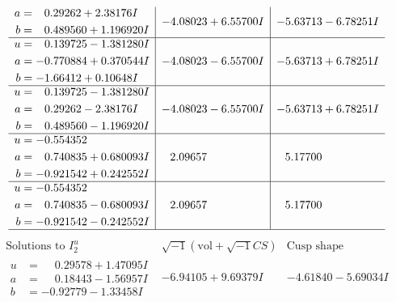 \documentclass[1p]{elsarticle_modified}
\theoremstyle{definition}
\newcommand{\I}{\sqrt{-1}}
\begin{document}
$$\begin{array}{c|c|c}
\begin{aligned}
a &= \phantom{-}0.29262 + 2.38176 I \\
b &= \phantom{-}0.489560 + 1.196920 I\end{aligned}
 & -4.08023 + 6.55700 I & -5.63713 - 6.78251 I \\ \hline\begin{aligned}
u &= \phantom{-}0.139725 - 1.381280 I \\
a &= -0.770884 + 0.370544 I \\
b &= -1.66412 + 0.10648 I\end{aligned}
 & -4.08023 - 6.55700 I & -5.63713 + 6.78251 I \\ \hline\begin{aligned}
u &= \phantom{-}0.139725 - 1.381280 I \\
a &= \phantom{-}0.29262 - 2.38176 I \\
b &= \phantom{-}0.489560 - 1.196920 I\end{aligned}
 & -4.08023 - 6.55700 I & -5.63713 + 6.78251 I \\ \hline\begin{aligned}
u &= -0.554352\phantom{ +0.000000I} \\
a &= \phantom{-}0.740835 + 0.680093 I \\
b &= -0.921542 + 0.242552 I\end{aligned}
 & \phantom{-}2.09657\phantom{ +0.000000I} & \phantom{-}5.17700\phantom{ +0.000000I} \\ \hline\begin{aligned}
u &= -0.554352\phantom{ +0.000000I} \\
a &= \phantom{-}0.740835 - 0.680093 I \\
b &= -0.921542 - 0.242552 I\end{aligned}
 & \phantom{-}2.09657\phantom{ +0.000000I} & \phantom{-}5.17700\phantom{ +0.000000I}\\
 \hline 
 \end{array}$$\newpage$$\begin{array}{c|c|c}  
\text{Solutions to }I^u_{2}& \I (\text{vol} + \sqrt{-1}CS) & \text{Cusp shape}\\
 \hline 
\begin{aligned}
u &= \phantom{-}0.29578 + 1.47095 I \\
a &= \phantom{-}0.18443 - 1.56957 I \\
b &= -0.92779 - 1.33458 I\end{aligned}
 & -6.94105 + 9.69379 I & -4.61840 - 5.69034 I \\ \hline\begin{aligned}

\end{aligned}
\end{array}$$
\end{document}
